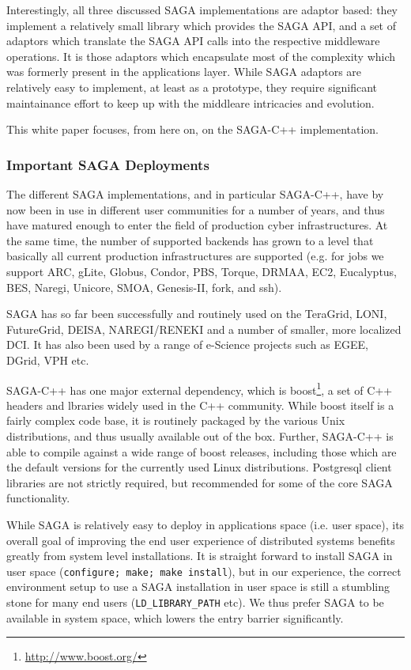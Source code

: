 \documentclass[12pt]{article}
\newcommand{\T}[1]{\texttt{#1}}
\begin{document}
   Interestingly, all three discussed SAGA implementations are adaptor
   based: they implement a relatively small library which provides the
   SAGA API, and a set of adaptors which translate the SAGA API calls
   into the respective middleware operations.  It is those adaptors
   which encapsulate most of the complexity which was formerly present
   in the applications layer.  While SAGA adaptors are relatively easy
   to implement, at least as a prototype, they require significant
   maintainance effort to keep up with the middleare intricacies and
   evolution.

   This white paper focuses, from here on, on the SAGA-C++
   implementation.


  \subsubsection{Important SAGA Deployments}

   The different SAGA implementations, and in particular SAGA-C++,
   have by now been in use in different user communities for a number
   of years, and thus have matured enough to enter the  field of
   production cyber infrastructures.  At the same time, the number of
   supported backends has grown to a level that basically all current
   production infrastructures are supported (e.g. for jobs we support
   ARC, gLite, Globus, Condor, PBS, Torque, DRMAA, EC2, Eucalyptus,
   BES,  Naregi, Unicore, SMOA, Genesis-II, fork, and ssh).  

   SAGA has so far been successfully and routinely used on the
   TeraGrid, LONI, FutureGrid, DEISA, NAREGI/RENEKI and a number of
   smaller, more localized DCI. It has also been used by a range of
   e-Science projects such as EGEE, DGrid, VPH etc.

   SAGA-C++ has one major external dependency, which is
   boost\footnote{\url{http://www.boost.org/}}, a set of C++ headers
   and lbraries widely used in the C++ community.  While boost itself
   is a fairly complex code base, it is routinely packaged by the
   various Unix distributions, and thus usually available out of the
   box.  Further, SAGA-C++ is able to compile against a wide range of
   boost releases, including those which are the default versions for
   the currently used Linux distributions.  Postgresql client
   libraries are not strictly required, but recommended for some of
   the core SAGA functionality.

   While SAGA is relatively easy to deploy in applications space (i.e.
   user space), its overall goal of improving the end user experience
   of distributed systems benefits greatly from system level
   installations.  It is straight forward to install SAGA in user
   space (\T{configure; make; make install}), but in our experience,
   the correct environment setup to use a SAGA installation in user
   space is still a stumbling stone for many end users
   (\T{LD\_LIBRARY\_PATH} etc).  We thus prefer SAGA to be available
   in system space, which lowers the entry barrier significantly.  
\end{document}
